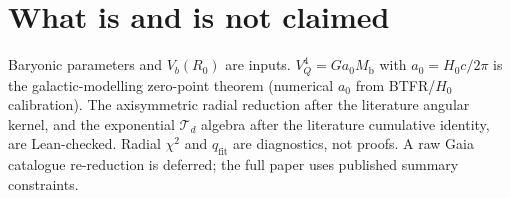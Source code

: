 \documentclass[11pt]{article}
\theoremstyle{definition}
\theoremstyle{remark}
\newcommand{\Mb}{M_{\mathrm{b}}}
\newcommand{\qfit}{q_{\mathrm{fit}}}
\begin{document}
\section{What is and is not claimed}
Baryonic parameters and $V_b(R_0)$ are inputs.
$V_Q^4=Ga_0\Mb$ with $a_0=H_0c/2\pi$ is the galactic-modelling zero-point theorem (numerical $a_0$ from BTFR/$H_0$ calibration).
The axisymmetric radial reduction after the literature angular kernel, and the exponential $\mathcal T_d$ algebra after the literature cumulative identity, are Lean-checked.
Radial $\chi^2$ and $\qfit$ are diagnostics, not proofs.
A raw Gaia catalogue re-reduction is deferred; the full paper uses published summary constraints.
\end{document}
